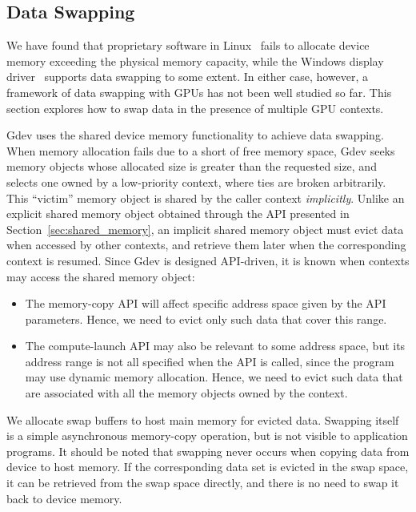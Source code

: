 \vspace{-0.25em}
\subsection{Data Swapping}
\label{sec:memory_swapping}
\vspace{-0.25em}

We have found that proprietary software in Linux~\cite{CUDA40} fails to
allocate device memory exceeding the physical memory capacity, while the
Windows display driver~\cite{Pronovost06} supports data swapping to 
some extent.
In either case, however, a framework of data swapping with GPUs has not
been well studied so far.
This section explores how to swap data in the presence of multiple GPU
contexts.

Gdev uses the shared device memory functionality to achieve data
swapping.
When memory allocation fails due to a short of free memory
space, Gdev seeks memory objects whose allocated size is greater than
the requested size, and selects one owned by a low-priority context,
where ties are broken arbitrarily.
This ``victim'' memory object is shared by the caller context 
\textit{implicitly}.
Unlike an explicit shared memory object obtained through the API
presented in Section~\ref{sec:shared_memory}, an implicit shared memory
object must evict data when accessed by other contexts, and retrieve
them later when the corresponding context is resumed.
Since Gdev is designed API-driven, it is known when contexts may access the
shared memory object:
\begin{itemize}
 \vspace{-0.25em}
 \item The memory-copy API will affect specific address space given by
       the API parameters.
       Hence, we need to evict only such data that cover this range.

 \vspace{-0.5em}
 \item The compute-launch API may also be relevant to some address
       space, but its address range is not all specified when the API is
       called, since the program may use dynamic memory allocation.
       Hence, we need to evict such data that are associated with all
       the memory objects owned by the context.
 \vspace{-0.25em}
\end{itemize}

We allocate swap buffers to host main memory for evicted data.
Swapping itself is a simple asynchronous memory-copy operation, but is
not visible to application programs.
It should be noted that swapping never occurs when copying data from
device to host memory.
If the corresponding data set is evicted in the swap space, it can be
retrieved from the swap space directly, and there is no need to swap it
back to device memory.


